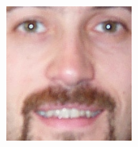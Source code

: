 \begin{figure}[H]
\begin{subfigure}{0.65\textwidth}
\begin{subfigure}{.33\textwidth}
  \caption{}
\end{subfigure}%
\begin{subfigure}{.33\textwidth}
  \centering
  \includegraphics[width=0.6\textwidth]{img/fdResult1/output18.png}
  \caption{}
\end{subfigure}%
\end{subfigure}%


\end{figure}
